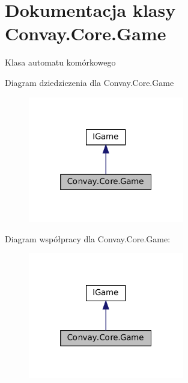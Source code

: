 \hypertarget{class_convay_1_1_core_1_1_game}{}\section{Dokumentacja klasy Convay.\+Core.\+Game}
\label{class_convay_1_1_core_1_1_game}


Klasa automatu komórkowego  




Diagram dziedziczenia dla Convay.\+Core.\+Game
\nopagebreak
\begin{figure}[H]
\begin{center}
\leavevmode
\includegraphics[width=193pt]{class_convay_1_1_core_1_1_game__inherit__graph}
\end{center}
\end{figure}


Diagram współpracy dla Convay.\+Core.\+Game\+:
\nopagebreak
\begin{figure}[H]
\begin{center}
\leavevmode
\includegraphics[width=193pt]{class_convay_1_1_core_1_1_game__coll__graph}
\end{center}
\end{figure}
